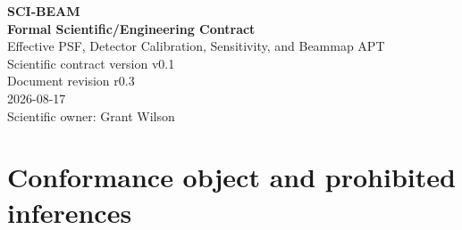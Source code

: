 \documentclass[10pt]{article}
\begin{document}
\hypersetup{pageanchor=false}

\begin{titlepage}
\centering\vspace*{0.65in}
{\Large\color{beamgreen}\textbf{SCI-BEAM}}\\[0.18in]
{\huge\textbf{Formal Scientific/Engineering Contract}}\\[0.20in]
{\Large Effective PSF, Detector Calibration, Sensitivity, and Beammap APT}\\[0.38in]
{\large Scientific contract version v0.1}\\[0.06in]
{\large Document revision r0.3}\\[0.08in]
{\large 2026-08-17}\\[0.50in]
\vfill {\large Scientific owner: Grant Wilson}
\end{titlepage}
\hypersetup{pageanchor=true}

\begin{abstract}
SCI-BEAM fits standardized per-detector Beammaps in raw $\Delta f/f$ to
measure an observation-local effective PSF core, reference-origin amplitude,
and relative detector geometry; derives source-atmosphere-corrected,
top-of-atmosphere nominal-beam \texttt{flxscale}; derives NEFD-like
\texttt{sens} from detector-specific off-source scans; and publishes a
mandatory scientific Beammap APT with independent quantity states and dense
companions. The fitted Gaussian is a full 2-D effective-core summary, not an
automatic intrinsic or complete PSF. Source atmosphere belongs to BEAM;
target atmosphere remains downstream. Exact production thresholds and several
sensitivity, adequacy, geometry, and kernel policies remain open.
\end{abstract}

\tableofcontents
\clearpage

\section{Conformance object and prohibited inferences}
\end{document}
